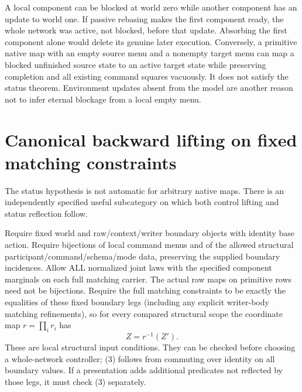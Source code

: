 \documentclass[11pt]{article}
\begin{document}
A local component can be blocked at world zero while another component has
an update to world one. If passive rebasing makes the first component ready,
the whole network was active, not blocked, before that update. Absorbing the
first component alone would delete its genuine later execution. Conversely,
a primitive native map with an empty source menu and a nonempty target menu
can map a blocked unfinished source state to an active target state while
preserving completion and all existing command squares vacuously. It does
not satisfy the status theorem. Environment updates absent from the model
are another reason not to infer eternal blockage from a local empty menu.

\section{Canonical backward lifting on fixed matching constraints}
The status hypothesis is not automatic for arbitrary native maps. There is
an independently specified useful subcategory on which both control lifting
and status reflection follow.

Require fixed world and raw/context/writer boundary objects with identity
base action. Require bijections of local command menus and of the allowed
structural participant/command/schema/mode data, preserving the supplied
boundary incidences. Allow ALL normalized joint laws with the specified
component marginals on each full matching carrier. The actual raw maps on
primitive rows need not be bijections. Require the full matching constraints
to be exactly the equalities of these fixed boundary legs (including any
explicit writer-body matching refinements), so for every compared structural
scope the coordinate map $r=\prod_i r_i$ has
\[
 Z=r^{-1}(Z').                                           \tag{3}
\]
These are local structural input conditions. They can be checked before
choosing a whole-network controller; (3) follows from commuting over identity
on all boundary values. If a presentation adds additional predicates not
reflected by those legs, it must check (3) separately.
\end{document}
